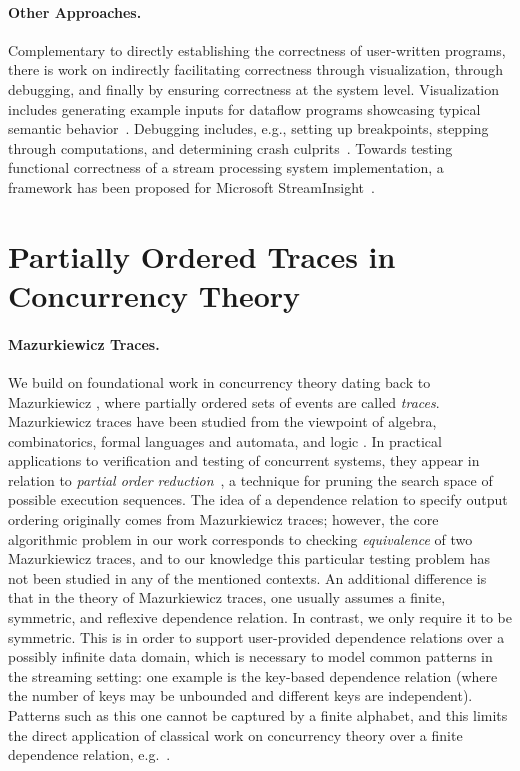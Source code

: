 \paragraph{Other Approaches.}
Complementary to directly establishing the correctness of user-written programs, there is work on indirectly facilitating correctness through visualization, through debugging, and finally by ensuring correctness at the system level.
Visualization includes generating example inputs for dataflow programs showcasing typical semantic behavior~\cite{olston2009generating}. Debugging includes, e.g., setting up breakpoints, stepping through computations, and determining crash culprits~\cite{gulzar2016bigdebug,olston2011inspector}.
Towards testing functional correctness of a stream processing system implementation, a framework has been proposed for Microsoft StreamInsight~\cite{raizman2010extensible}.

\section{Partially Ordered Traces in Concurrency Theory}

\paragraph{Mazurkiewicz Traces.}
We build on foundational work in concurrency theory dating back to Mazurkiewicz \cite{mazurkiewicz1986trace}, where partially ordered sets of events are called \emph{traces}. Mazurkiewicz traces have been studied from the
viewpoint of algebra, combinatorics, formal languages and automata, and
logic \cite{DiekertR1995}. In practical applications to verification and
testing of concurrent systems, they appear in relation to
\emph{partial order reduction}~\cite{God96,Peled94}, a technique for
pruning the search space of possible execution sequences.
The idea of a dependence relation to specify output ordering originally comes from Mazurkiewicz traces; however, the core algorithmic problem in our work corresponds to checking \emph{equivalence} of two Mazurkiewicz traces, and to our knowledge this particular testing problem has not been studied in any of the mentioned contexts.
An additional difference is that in the theory of Mazurkiewicz traces, one usually assumes a finite, symmetric, and reflexive dependence relation. In contrast, we only require it to be symmetric. This is in order to support user-provided dependence relations over a possibly infinite data domain, which is necessary to model common patterns in the streaming setting: one example is the key-based dependence relation (where the number of keys may be unbounded and different keys are independent). Patterns such as this one cannot be captured by a finite alphabet, and this limits the direct application of classical work on concurrency theory over a finite dependence relation, e.g.~\cite{DiekertR1995}.


